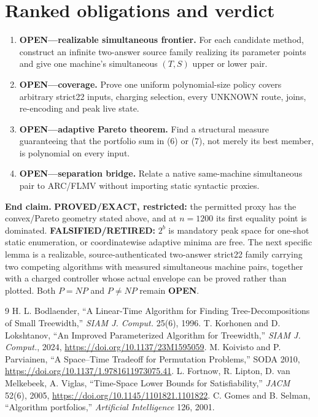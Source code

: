 \documentclass[11pt]{article}
\begin{document}
\section{Ranked obligations and verdict}
\begin{enumerate}
\item \textbf{OPEN---realizable simultaneous frontier.}  For each candidate
method, construct an infinite two-answer source family realizing its parameter
points and give one machine's simultaneous $(T,S)$ upper or lower pair.
\item \textbf{OPEN---coverage.}  Prove one uniform polynomial-size policy
covers arbitrary strict22 inputs, charging selection, every UNKNOWN route,
joins, re-encoding and peak live state.
\item \textbf{OPEN---adaptive Pareto theorem.}  Find a structural measure
guaranteeing that the portfolio sum in (6) or (7), not merely its best member,
is polynomial on every input.
\item \textbf{OPEN---separation bridge.}  Relate a native same-machine
simultaneous pair to ARC/FLMV without importing static syntactic proxies.
\end{enumerate}

\textbf{End claim.}  \textbf{PROVED/EXACT, restricted:} the permitted proxy
has the convex/Pareto geometry stated above, and at $n=1200$ its first equality
point is dominated.  \textbf{FALSIFIED/RETIRED:} $2^b$ is mandatory peak
space for one-shot static enumeration, or coordinatewise adaptive minima are
free.  The next specific lemma is a realizable, source-authenticated
two-answer strict22 family carrying two competing algorithms with measured
simultaneous machine pairs, together with a charged controller whose actual
envelope can be proved rather than plotted.  Both $P=NP$ and $P\ne NP$ remain
\textbf{OPEN}.

\begin{thebibliography}{9}
 H. L. Bodlaender, ``A Linear-Time Algorithm for Finding
Tree-Decompositions of Small Treewidth,'' \emph{SIAM J. Comput.} 25(6), 1996.
 T. Korhonen and D. Lokshtanov, ``An Improved Parameterized
Algorithm for Treewidth,'' \emph{SIAM J. Comput.}, 2024,
\url{https://doi.org/10.1137/23M1595059}.
 M. Koivisto and P. Parviainen, ``A Space--Time Tradeoff for
Permutation Problems,'' SODA 2010, \url{https://doi.org/10.1137/1.9781611973075.41}.
 L. Fortnow, R. Lipton, D. van Melkebeek, A. Viglas,
``Time-Space Lower Bounds for Satisfiability,'' \emph{JACM} 52(6), 2005,
\url{https://doi.org/10.1145/1101821.1101822}.
 C. Gomes and B. Selman, ``Algorithm portfolios,''
\emph{Artificial Intelligence} 126, 2001.
\end{thebibliography}

\end{document}
